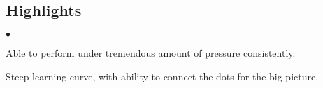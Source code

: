 \documentclass[margin,line]{res}
\newenvironment{list2}{
  \begin{list}{$\bullet$}{%
      \setlength{\itemsep}{0.05in}
      \setlength{\parsep}{0in} \setlength{\parskip}{0in}
      \setlength{\topsep}{0in} \setlength{\partopsep}{0in} 
      \setlength{\leftmargin}{0.2in}}}{\end{list}}
\begin{document}
\address{ 1300, Hope St, Stamford, CT 06907. $\bullet$ 917-558-4825 }
\address{ \href{mailto: harsshal@nyu.edu} {harsshal@nyu.edu} $\bullet$ 
          \href{https://sites.google.com/site/harsshal/}{https://sites.google.com/site/harsshal/} } 

\begin{resume}

\section{\sc Highlights}
\begin{list2}
\item Able to perform under tremendous amount of pressure consistently.
\item Steep learning curve, with ability to connect the dots for the big picture. 
\end{list2}


\end{resume}
\end{document}
